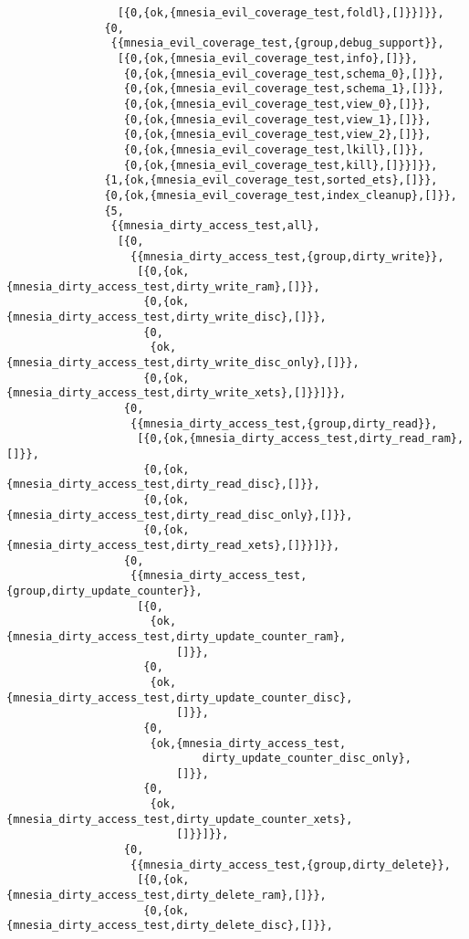 \begin{verbatim}
                 [{0,{ok,{mnesia_evil_coverage_test,foldl},[]}}]}},
               {0,
                {{mnesia_evil_coverage_test,{group,debug_support}},
                 [{0,{ok,{mnesia_evil_coverage_test,info},[]}},
                  {0,{ok,{mnesia_evil_coverage_test,schema_0},[]}},
                  {0,{ok,{mnesia_evil_coverage_test,schema_1},[]}},
                  {0,{ok,{mnesia_evil_coverage_test,view_0},[]}},
                  {0,{ok,{mnesia_evil_coverage_test,view_1},[]}},
                  {0,{ok,{mnesia_evil_coverage_test,view_2},[]}},
                  {0,{ok,{mnesia_evil_coverage_test,lkill},[]}},
                  {0,{ok,{mnesia_evil_coverage_test,kill},[]}}]}},
               {1,{ok,{mnesia_evil_coverage_test,sorted_ets},[]}},
               {0,{ok,{mnesia_evil_coverage_test,index_cleanup},[]}},
               {5,
                {{mnesia_dirty_access_test,all},
                 [{0,
                   {{mnesia_dirty_access_test,{group,dirty_write}},
                    [{0,{ok,{mnesia_dirty_access_test,dirty_write_ram},[]}},
                     {0,{ok,{mnesia_dirty_access_test,dirty_write_disc},[]}},
                     {0,
                      {ok,{mnesia_dirty_access_test,dirty_write_disc_only},[]}},
                     {0,{ok,{mnesia_dirty_access_test,dirty_write_xets},[]}}]}},
                  {0,
                   {{mnesia_dirty_access_test,{group,dirty_read}},
                    [{0,{ok,{mnesia_dirty_access_test,dirty_read_ram},[]}},
                     {0,{ok,{mnesia_dirty_access_test,dirty_read_disc},[]}},
                     {0,{ok,{mnesia_dirty_access_test,dirty_read_disc_only},[]}},
                     {0,{ok,{mnesia_dirty_access_test,dirty_read_xets},[]}}]}},
                  {0,
                   {{mnesia_dirty_access_test,{group,dirty_update_counter}},
                    [{0,
                      {ok,{mnesia_dirty_access_test,dirty_update_counter_ram},
                          []}},
                     {0,
                      {ok,{mnesia_dirty_access_test,dirty_update_counter_disc},
                          []}},
                     {0,
                      {ok,{mnesia_dirty_access_test,
                              dirty_update_counter_disc_only},
                          []}},
                     {0,
                      {ok,{mnesia_dirty_access_test,dirty_update_counter_xets},
                          []}}]}},
                  {0,
                   {{mnesia_dirty_access_test,{group,dirty_delete}},
                    [{0,{ok,{mnesia_dirty_access_test,dirty_delete_ram},[]}},
                     {0,{ok,{mnesia_dirty_access_test,dirty_delete_disc},[]}},

\end{verbatim}
